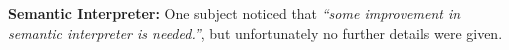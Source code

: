 \noindent \textbf{Semantic Interpreter:} One subject noticed that \emph{``some improvement in semantic interpreter is needed.''}, but unfortunately no further details were given.





